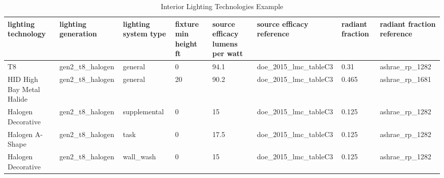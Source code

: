 \begin{table}
\scriptsize
\centering
\caption[Interior Lighting Technologies Example]{Interior Lighting Technologies Example}
\label{tab:int_light_techs}
\begin{tabular}{|p{0.5in}|p{0.5in}|p{0.5in}|p{0.5in}|p{0.5in}|p{0.5in}|p{0.5in}|p{0.5in}|}
\hline
\textbf{lighting technology} & \textbf{lighting generation} & \textbf{lighting system type} & \textbf{fixture min height ft} & \textbf{source efficacy lumens per watt} & \textbf{source efficacy reference} & \textbf{radiant fraction} & \textbf{radiant fraction reference} \\ \hline
T8 & gen2\_t8\_halogen & general & 0 & 94.1 & doe\_2015\_lmc\_tableC3 & 0.31 & ashrae\_rp\_1282 \\ \hline
HID High Bay Metal Halide & gen2\_t8\_halogen & general & 20 & 90.2 & doe\_2015\_lmc\_tableC3 & 0.465 & ashrae\_rp\_1681 \\ \hline
Halogen Decorative & gen2\_t8\_halogen & supplemental & 0 & 15 & doe\_2015\_lmc\_tableC3 & 0.125 & ashrae\_rp\_1282 \\ \hline
Halogen A-Shape & gen2\_t8\_halogen & task & 0 & 17.5 & doe\_2015\_lmc\_tableC3 & 0.125 & ashrae\_rp\_1282 \\ \hline
Halogen Decorative & gen2\_t8\_halogen & wall\_wash & 0 & 15 & doe\_2015\_lmc\_tableC3 & 0.125 & ashrae\_rp\_1282\\ \hline
\end{tabular}
\end{table}